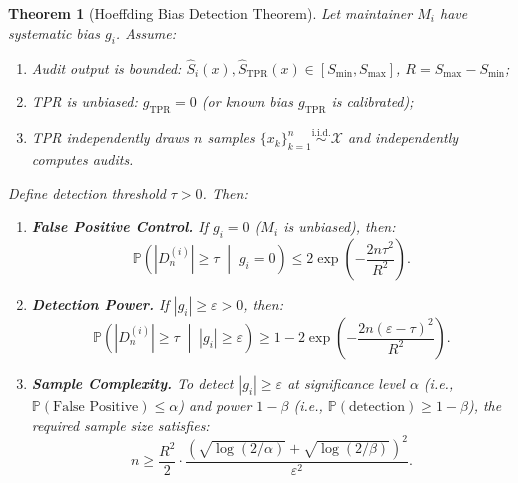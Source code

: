 \documentclass[11pt,a4paper]{article}
\newtheorem{theorem}{Theorem}[section]
\theoremstyle{definition}
\newcommand{\Prob}{\mathbb{P}}
\begin{document}
\begin{theorem}[Hoeffding Bias Detection Theorem]
\label{thm:hoeffding_detection}
Let maintainer $M_i$ have systematic bias $g_i$. Assume:
\begin{enumerate}[label=(A\arabic*), leftmargin=*]
    \item Audit output is bounded: $\hat{S}_i(x), \hat{S}_{\text{TPR}}(x) \in [S_{\min}, S_{\max}]$, $R = S_{\max} - S_{\min}$;
    \item TPR is unbiased: $g_{\text{TPR}} = 0$ (or known bias $g_{\text{TPR}}$ is calibrated);
    \item TPR independently draws $n$ samples $\{x_k\}_{k=1}^{n} \overset{\text{i.i.d.}}{\sim} \mathcal{X}$ and independently computes audits.
\end{enumerate}

Define detection threshold $\tau > 0$. Then:
\begin{enumerate}[label=(\roman*), leftmargin=*]
    \item \textbf{False Positive Control.} If $g_i = 0$ ($M_i$ is unbiased), then:
    \begin{equation}\label{eq:false_pos}
        \Prob\left(|D_n^{(i)}| \geq \tau \;\middle|\; g_i = 0\right) \leq 2\exp\left(-\frac{2n\tau^2}{R^2}\right).
    \end{equation}
    
    \item \textbf{Detection Power.} If $|g_i| \geq \varepsilon > 0$, then:
    \begin{equation}\label{eq:detect_power}
        \Prob\left(|D_n^{(i)}| \geq \tau \;\middle|\; |g_i| \geq \varepsilon\right) \geq 1 - 2\exp\left(-\frac{2n(\varepsilon - \tau)^2}{R^2}\right).
    \end{equation}
    
    \item \textbf{Sample Complexity.} To detect $|g_i| \geq \varepsilon$ at significance level $\alpha$ (i.e., $\Prob(\text{False Positive}) \leq \alpha$) and power $1-\beta$ (i.e., $\Prob(\text{detection}) \geq 1-\beta$), the required sample size satisfies:
    \begin{equation}\label{eq:sample_complexity}
        n \geq \frac{R^2}{2} \cdot \frac{\left(\sqrt{\log(2/\alpha)} + \sqrt{\log(2/\beta)}\right)^2}{\varepsilon^2}.
    \end{equation}
\end{enumerate}
\end{theorem}
\end{document}
